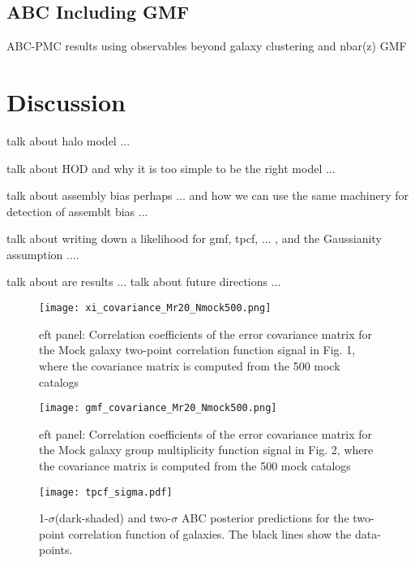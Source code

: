 \subsection{ABC Including GMF}
ABC-PMC results using observables beyond galaxy clustering and nbar(z) GMF

\section{Discussion}\label{sec:discussion}


talk about halo model ...

talk about HOD and why it is too simple to be the right model ...

talk about assembly bias perhaps ... and how we can use the same machinery for detection of assemblt bias ... 

talk about writing down a likelihood for gmf, tpcf, ... , and the Gaussianity assumption ....

talk about are results ...
talk about future directions ...


\begin{figure*}
\begin{center}
  \texttt{[image: xi\_covariance\_Mr20\_Nmock500.png]}
\caption{eft panel:
Correlation coefficients of the error covariance matrix for the Mock galaxy two-point correlation function signal in Fig. 1, where the covariance matrix is computed from the 500 mock catalogs}
\label{fig:2pcf-model}
\end{center}
\end{figure*}

\begin{figure*}
\begin{center}
  \texttt{[image: gmf\_covariance\_Mr20\_Nmock500.png]}
\caption{eft panel:
Correlation coefficients of the error covariance matrix for the Mock galaxy group multiplicity function signal in Fig. 2, where the covariance matrix
is computed from the 500 mock catalogs}
\label{fig:2pcf-model}
\end{center}
\end{figure*}


\begin{figure*}
\begin{center}
  \texttt{[image: tpcf\_sigma.pdf]}
\caption{1-$\sigma$(dark-shaded) and two-$\sigma$ ABC posterior predictions
for the two-point correlation function of galaxies. The black lines show the data-points.}
\label{fig:2pcf-model}
\end{center}
\end{figure*}


